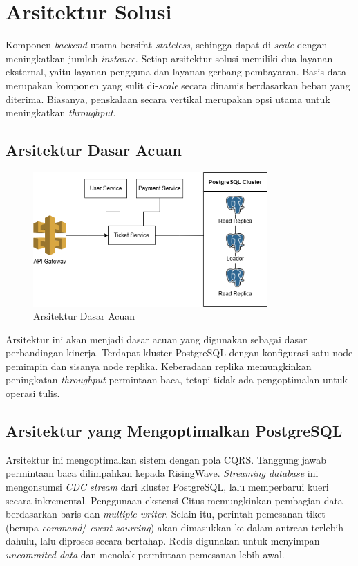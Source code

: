 \chapter{Arsitektur Solusi}

Komponen \textit{backend} utama bersifat \textit{stateless}, sehingga dapat di-\textit{scale} dengan meningkatkan jumlah \textit{instance}. Setiap arsitektur solusi memiliki dua layanan eksternal, yaitu layanan pengguna dan layanan gerbang pembayaran. Basis data merupakan komponen yang sulit di-\textit{scale} secara dinamis berdasarkan beban yang diterima. Biasanya, penskalaan secara vertikal merupakan opsi utama untuk meningkatkan \textit{throughput}.

\section{Arsitektur Dasar Acuan}

\begin{figure}[ht]
    \centering
    \includegraphics[width=0.8\textwidth]{resources/chapter-3/architecture-reference.png}
    \caption{Arsitektur Dasar Acuan}
    \label{fig:baseline-architecture}
\end{figure}

Arsitektur ini akan menjadi dasar acuan yang digunakan sebagai dasar perbandingan kinerja. Terdapat kluster PostgreSQL dengan konfigurasi satu node pemimpin dan sisanya node replika. Keberadaan replika memungkinkan peningkatan \textit{throughput} permintaan baca, tetapi tidak ada pengoptimalan untuk operasi tulis.

\section{Arsitektur yang Mengoptimalkan PostgreSQL}

Arsitektur ini mengoptimalkan sistem dengan pola CQRS. Tanggung jawab permintaan baca dilimpahkan kepada RisingWave. \textit{Streaming database} ini mengonsumsi \textit{CDC stream} dari kluster PostgreSQL, lalu memperbarui kueri secara inkremental. Penggunaan ekstensi Citus memungkinkan pembagian data berdasarkan baris dan \textit{multiple writer}. Selain itu, perintah pemesanan tiket (berupa \textit{command}/ \textit{event sourcing}) akan dimasukkan ke dalam antrean terlebih dahulu, lalu diproses secara bertahap. Redis digunakan untuk menyimpan \textit{uncommited data} dan menolak permintaan pemesanan lebih awal.

